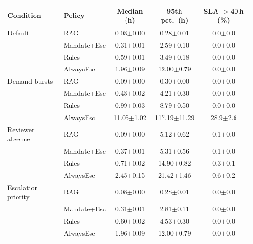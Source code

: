 \begin{tabular}{llccc}
\toprule
Condition & Policy & Median (h) & 95th pct.\ (h) & SLA $>$40\,h (\%)\\
\midrule
Default & RAG & 0.08$\pm$0.00 & 0.28$\pm$0.01 & 0.0$\pm$0.0\\
 & Mandate+Esc & 0.31$\pm$0.01 & 2.59$\pm$0.10 & 0.0$\pm$0.0\\
 & Rules & 0.59$\pm$0.01 & 3.49$\pm$0.18 & 0.0$\pm$0.0\\
 & AlwaysEsc & 1.96$\pm$0.09 & 12.00$\pm$0.79 & 0.0$\pm$0.0\\
\midrule
Demand bursts & RAG & 0.09$\pm$0.00 & 0.30$\pm$0.00 & 0.0$\pm$0.0\\
 & Mandate+Esc & 0.48$\pm$0.02 & 4.21$\pm$0.30 & 0.0$\pm$0.0\\
 & Rules & 0.99$\pm$0.03 & 8.79$\pm$0.50 & 0.0$\pm$0.0\\
 & AlwaysEsc & 11.05$\pm$1.02 & 117.19$\pm$11.29 & 28.9$\pm$2.6\\
\midrule
Reviewer absence & RAG & 0.09$\pm$0.00 & 5.12$\pm$0.62 & 0.1$\pm$0.0\\
 & Mandate+Esc & 0.37$\pm$0.01 & 5.31$\pm$0.56 & 0.1$\pm$0.0\\
 & Rules & 0.71$\pm$0.02 & 14.90$\pm$0.82 & 0.3$\pm$0.1\\
 & AlwaysEsc & 2.45$\pm$0.15 & 21.42$\pm$1.46 & 0.6$\pm$0.2\\
\midrule
Escalation priority & RAG & 0.08$\pm$0.00 & 0.28$\pm$0.01 & 0.0$\pm$0.0\\
 & Mandate+Esc & 0.31$\pm$0.01 & 2.81$\pm$0.11 & 0.0$\pm$0.0\\
 & Rules & 0.60$\pm$0.02 & 4.53$\pm$0.30 & 0.0$\pm$0.0\\
 & AlwaysEsc & 1.96$\pm$0.09 & 12.00$\pm$0.79 & 0.0$\pm$0.0\\
\bottomrule
\end{tabular}
